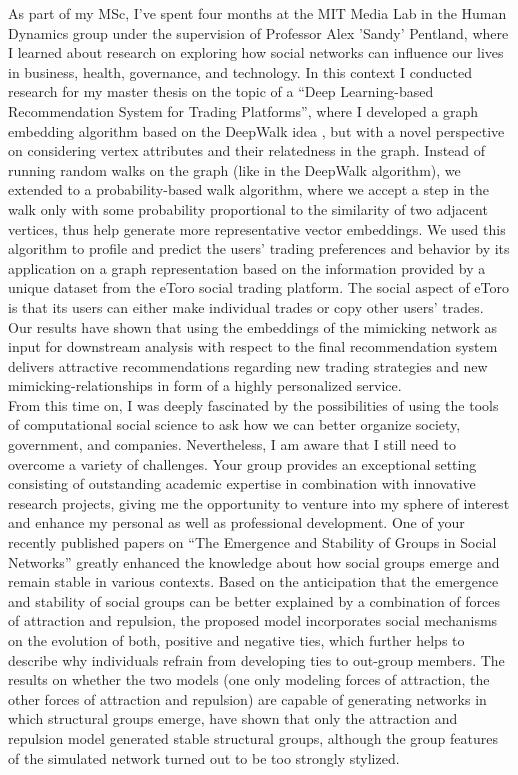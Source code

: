 As part of my MSc, I've spent four months at the MIT Media Lab in the Human Dynamics group under the supervision of Professor Alex 'Sandy' Pentland, where I learned about research on exploring how social networks can influence our lives in business, health, governance, and technology. 
In this context I conducted research for my master thesis on the topic of a ``Deep Learning-based Recommendation System for Trading Platforms'', where I developed a graph embedding algorithm based on the DeepWalk idea \cite{perozzi2014deepwalk}, but with a novel perspective on considering vertex attributes and their relatedness in the graph. 
Instead of running random walks on the graph (like in the DeepWalk algorithm), we extended to a probability-based walk algorithm, where we accept a step in the walk only with some probability proportional to the similarity of two adjacent vertices, thus help generate more representative vector embeddings. 
We used this algorithm to profile and predict the users' trading preferences and behavior by its application on a graph representation based on the information provided by a unique dataset from the eToro social trading platform. The social aspect of eToro is that its users can either make individual trades or copy other users' trades.
Our results have shown that using the embeddings of the mimicking network as input for downstream analysis with respect to the final recommendation system delivers attractive recommendations regarding new trading strategies and new mimicking-relationships in form of a highly personalized service.\\

From this time on, I was deeply fascinated by the possibilities of using the tools of computational social science to ask how we can better organize society, government, and companies. 
Nevertheless, I am aware that I still need to overcome a variety of challenges. 
Your group provides an exceptional setting consisting of outstanding academic expertise in combination with innovative research projects, giving me the opportunity to venture into my sphere of interest and enhance my personal as well as professional development.
One of your recently published papers on ``The Emergence and Stability of Groups in Social Networks'' \cite{stadtfeld2020emergence} greatly enhanced the knowledge about how social groups emerge and remain stable in various contexts.
Based on the anticipation that the emergence and stability of social groups can be better explained by a combination of forces of attraction and repulsion, the proposed model incorporates social mechanisms on the evolution of both, positive and negative ties, which further helps to describe why individuals refrain from developing ties to out-group members.
The results on whether the two models (one only modeling forces of attraction, the other forces of attraction and repulsion) are capable of generating networks in which structural groups emerge, have shown that only the attraction and repulsion model generated stable structural groups, although the group features of the simulated network turned out to be too strongly stylized.\\

